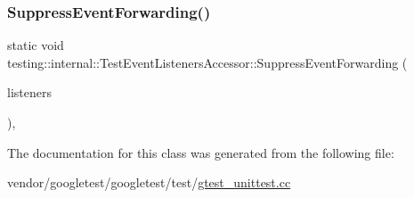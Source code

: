 \subsubsection{\texorpdfstring{Suppress\+Event\+Forwarding()}{SuppressEventForwarding()}}
{\footnotesize\ttfamily static void testing\+::internal\+::\+Test\+Event\+Listeners\+Accessor\+::\+Suppress\+Event\+Forwarding (\begin{DoxyParamCaption}\item[{\hyperlink{classtesting_1_1_test_event_listeners}{Test\+Event\+Listeners} $\ast$}]{listeners }\end{DoxyParamCaption})\hspace{0.3cm}{\ttfamily [inline]}, {\ttfamily [static]}}



The documentation for this class was generated from the following file\+:\begin{DoxyCompactItemize}
\item 
vendor/googletest/googletest/test/\hyperlink{gtest__unittest_8cc}{gtest\+\_\+unittest.\+cc}\end{DoxyCompactItemize}
